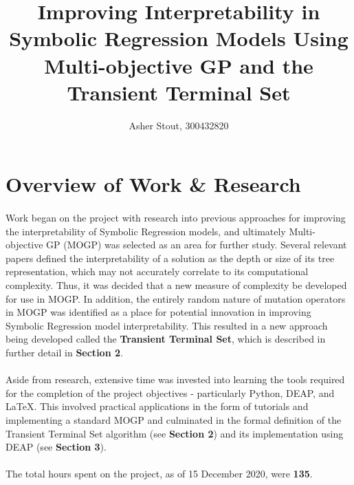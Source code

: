 \documentclass[a4paper]{article}
\title{Improving Interpretability in Symbolic Regression Models Using Multi-objective GP and the Transient Terminal Set}
\author{Asher Stout, 300432820}
\begin{document}
\maketitle

\section{Overview of Work \& Research}
\paragraph{} Work began on the project with research into previous approaches for improving the interpretability of Symbolic Regression models, and ultimately Multi-objective GP (MOGP) was selected as an area for further study. Several relevant papers defined the interpretability of a solution as the depth or size of its tree representation, which may not accurately correlate to its computational complexity. Thus, it was decided that a new measure of complexity be developed for use in MOGP. In addition, the entirely random nature of mutation operators in MOGP was identified as a place for potential innovation in improving Symbolic Regression model interpretability. This resulted in a new approach being developed called the \textbf{Transient Terminal Set}, which is described in further detail in \textbf{Section 2}.
\paragraph{} Aside from research, extensive time was invested into learning the tools required for the completion of the project objectives - particularly Python, DEAP, and LaTeX. This involved practical applications in the form of tutorials and implementing a standard MOGP and culminated in the formal definition of the Transient Terminal Set algorithm (see \textbf{Section 2}) and its implementation using DEAP (see \textbf{Section 3}). 
\paragraph{}The total hours spent on the project, as of 15 December 2020, were \textbf{135}.

\end{document}
